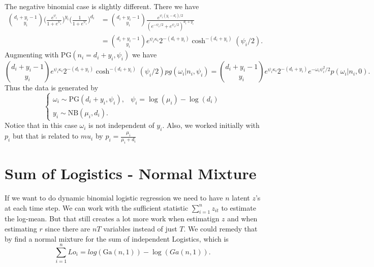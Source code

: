 \documentclass{article}
\newcommand{\PG}{\text{PG}}
\newcommand{\Ga}{\text{Ga}}
\newcommand{\NB}{\text{NB}}
\begin{document}
The negative binomial case is slightly different.  There we have
\begin{align*}
{d_i + y_i - 1 \choose y_i} \Big( \frac{e^{\psi_i}}{1 + e^{\psi_i}} \Big)^{y_i}
\Big( \frac{1}{1 + e^{\psi_i}} \Big)^{d_i}
& = 
{d_i + y_i - 1 \choose y_i} \frac{e^{\psi_i (y_i - d_i) /
    2}}{(e^{-\psi_i/2}+e^{\psi_i/2})^{d_i+y_i}} \\
& = {d_i + y_i - 1 \choose y_i} e^{\psi_i \kappa_i} 2^{-(d_i+y_i)}
\cosh^{-(d_i+y_i)}(\psi_i/2). 
\end{align*}
Augmenting with $\PG(n_i = d_i + y_i, \psi_i)$ we have
\[
 {d_i + y_i - 1 \choose y_i} e^{\psi_i \kappa_i} 2^{-(d_i+y_i)}
\cosh^{-(d_i+y_i)}(\psi_i/2) pg(\omega_i | n_i, \psi_i)
= {d_i + y_i - 1 \choose y_i} e^{\psi_i \kappa_i} 2^{-(d_i+y_i)} e^{-\omega_i
\psi_i^2 / 2} p(\omega_i | n_i, 0).
\]
Thus the data is generated by
\[
\begin{cases}
\omega_i \sim \PG(d_i+y_i, \psi_i), & \psi_i = \log(\mu_i) - \log(d_i) \\
y_i \sim \NB(\mu_i, d_i).
\end{cases}
\]
Notice that in this case $\omega_i$ is not independent of $y_i$.  Also, we
worked initially with $p_i$ but that is related to $mu_i$ by $p_i =
\frac{\mu_i}{\mu_i + d_i}$

\section{Sum of Logistics - Normal Mixture}

If we want to do dynamic binomial logistic regression we need to have $n$ latent
$z$'s at each time step.  We can work with the sufficient statistic
$\sum_{i=1}^n z_{it}$ to estimate the log-mean.  But that still creates a lot
more work when estimatign $z$ and when estimating $r$ since there are $nT$
variables instead of just $T$.  We could remedy that by find a normal mixture
for the sum of independent Logistics, which is
\[
\sum_{i=1}^n Lo_i = log(\Ga(n,1)) - \log(Ga(n,1)).
\]

{}

\end{document}
